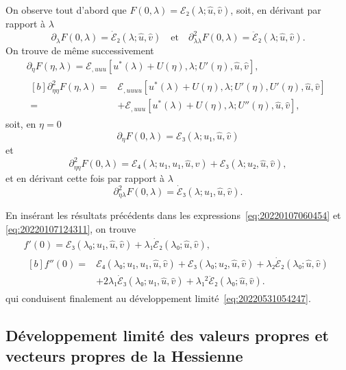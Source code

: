 \documentclass[12pt, final]{amsart}
\theoremstyle{definition}
\begin{document}
On observe tout d'abord que \(F(0, λ) =ℰ₂(λ; \hat{u}, \hat{v})\), soit, en
dérivant par rapport à \(λ\)
\begin{equation}
  ∂_{λ} F(0, λ) = \dot{ℰ}₂(λ; \hat{u}, \hat{v})
  \quad \text{et} \quad
  ∂_{λ λ}^2 F(0, λ) = \ddot{ℰ}₂(λ; \hat{u}, \hat{v}).
\end{equation}
On trouve de même successivement
\begin{gather}
  ∂_{η} F(η, λ) = ℰ_{, u u u} [u^{\ast}(λ) + U(η), λ; U'(η), \hat{u}, \hat{v}],\\
  \begin{aligned}[b]
    ∂_{η η}^2 F(η, λ)
    ={} & ℰ_{, u u u u} [u^{\ast}(λ) + U(η), λ ; U'(η), U'(η), \hat{u}, \hat{v}] \\
    ={} & +ℰ_{, u u u} [u^{\ast}(λ) + U(η), λ; U''(η), \hat{u}, \hat{v}],
  \end{aligned}
\end{gather}
soit, en \(η = 0\)
\begin{equation}
  ∂_{η} F(0, λ) = ℰ₃(λ; u₁, \hat{u}, \hat{v})
\end{equation}
et
\begin{equation}
  ∂_{η η}^2 F(0, λ) = ℰ₄(λ ; u₁, u₁, \hat{u}, \hat{v}) + ℰ₃(λ; u₂, \hat{u}, \hat{v}),
\end{equation}
et en dérivant cette fois par rapport à \(λ\)
\begin{equation}
  ∂_{η λ}^2 F(0, λ) = \dot{ℰ}₃(λ; u₁, \hat{u}, \hat{v}).
\end{equation}

En insérant les résultats précédents dans les
expressions~\eqref{eq:20220107060454} et \eqref{eq:20220107124311}, on trouve
\begin{gather}
  f'(0) =ℰ₃(λ₀; u₁, \hat{u}, \hat{v}) + λ₁ \dot{ℰ}₂(λ₀; \hat{u}, \hat{v}),\\
  \begin{aligned}[b]
    f''(0)
    ={} & ℰ₄(λ₀; u₁, u₁, \hat{u}, \hat{v}) +ℰ₃(λ₀; u₂, \hat{u}, \hat{v}) + λ₂ \dot{ℰ}₂(λ₀; \hat{u}, \hat{v})\\
    & + 2 λ₁ \dot{ℰ}₃(λ₀ ; u₁, \hat{u}, \hat{v}) + λ₁^2 \ddot{ℰ}₂(λ₀ ; \hat{u}, \hat{v}).
  \end{aligned}
\end{gather}
qui conduisent finalement au développement limité~\eqref{eq:20220531054247}.

\subsection{Développement limité des valeurs propres et vecteurs
propres de la Hessienne}
\end{document}
